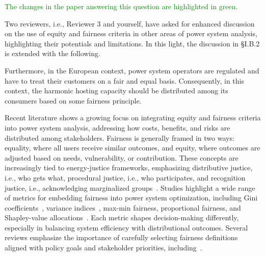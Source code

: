 \documentclass[10pt]{article}
\begin{document}
\begin{tcolorbox}[colback=black!5!white,colframe=black]
\textcolor{green}{The changes in the paper answering this question are highlighted in green.} \newline 

Two reviewers, i.e., Reviewer 3 and yourself, have asked for enhanced discussion on the use of equity and fairness criteria in other areas of power system analysis, highlighting their potentials and limitations. In this light, the discussion in \S I.B.2 is extended with the following. \newline

Furthermore, in the European context, power system operators are regulated and have to treat their customers on a fair and equal basis. Consequently, in this context, the harmonic hosting capacity should be distributed among its consumers based on some fairness principle. \newline

Recent literature shows a growing focus on integrating equity and fairness criteria into power system analysis, addressing how costs, benefits, and risks are distributed among stakeholders. Fairness is generally framed in two ways: equality, where all users receive similar outcomes, and equity, where outcomes are adjusted based on needs, vulnerability, or contribution. These concepts are increasingly tied to energy-justice frameworks, emphasizing distributive justice, i.e., who gets what, procedural justice, i.e., who participates, and recognition justice, i.e., acknowledging marginalized groups~\cite{goforth_incorporating_2025}. Studies highlight a wide range of metrics for embedding fairness into power system optimization, including Gini coefficients~\cite{sun_gini_2020}, variance indices~\cite{heylen_fairness_2019}, max-min fairness, proportional fairness, and Shapley-value allocations~\cite{obrien_shapley_2015}. Each metric shapes decision-making differently, especially in balancing system efficiency with distributional outcomes. Several reviews emphasize the importance of carefully selecting fairness definitions aligned with policy goals and stakeholder priorities, including~\cite{goforth_incorporating_2025}. \newline


\end{tcolorbox}
\end{document}
